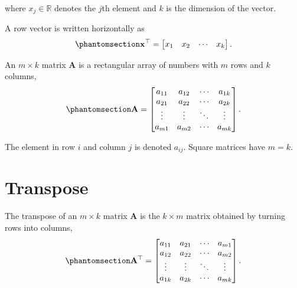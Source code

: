 \documentclass[
  letterpaper,
  DIV=11,
  numbers=noendperiod]{scrreprt}
\begin{document}
where \(x_{j} \in \mathbb{R}\) denotes the \(j\)th element and \(k\) is
the dimension of the vector.

A row vector is written horizontally as
\begin{equation}\protect\phantomsection\label{eq-gen-0045}{  
\begin{align}
    \mathbf{x}^{\top} = \begin{bmatrix}
    x_{1} & x_{2} & \cdots & x_{k}
\end{bmatrix}.
\end{align}
}\end{equation}

An \(m \times k\) matrix \(\mathbf{A}\) is a rectangular array of
numbers with \(m\) rows and \(k\) columns,
\begin{equation}\protect\phantomsection\label{eq-gen-0046}{  
\begin{align}
\mathbf{A}
=
\begin{bmatrix}
a_{11} & a_{12} & \cdots & a_{1k} \\
a_{21} & a_{22} & \cdots & a_{2k} \\
\vdots & \vdots & \ddots & \vdots \\
a_{m1} & a_{m2} & \cdots & a_{mk}
\end{bmatrix}.
\end{align}
}\end{equation}

The element in row \(i\) and column \(j\) is denoted \(a_{ij}\). Square
matrices have \(m = k\).

\section{Transpose}\label{transpose}

The transpose of an \(m \times k\) matrix \(\mathbf{A}\) is the
\(k \times m\) matrix obtained by turning rows into columns,
\begin{equation}\protect\phantomsection\label{eq-gen-0047}{ 
\begin{align}
\mathbf{A}^{\top}
=
\begin{bmatrix}
a_{11} & a_{21} & \cdots & a_{m1} \\
a_{12} & a_{22} & \cdots & a_{m2} \\
\vdots & \vdots & \ddots & \vdots \\
a_{1k} & a_{2k} & \cdots & a_{mk}
\end{bmatrix}.
\end{align}
}\end{equation}
\end{document}

